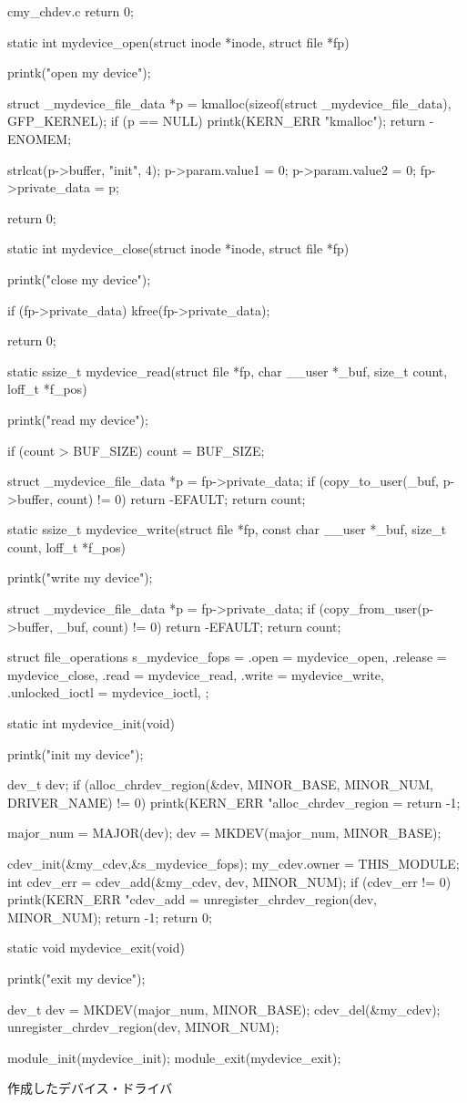 \begin{longlisting}
\begin{myminted}{c}{my\_chdev.c}
{    return 0;
}

static int mydevice_open(struct inode *inode, struct file *fp) {
    printk("open my device\n");

    struct _mydevice_file_data *p = kmalloc(sizeof(struct _mydevice_file_data), GFP_KERNEL);
    if (p == NULL) {
        printk(KERN_ERR  "kmalloc\n");
        return -ENOMEM;
    }

    strlcat(p->buffer, "init", 4);
    p->param.value1 = 0;
    p->param.value2 = 0;
    fp->private_data = p;

    return 0;
}

static int mydevice_close(struct inode *inode, struct file *fp) {
    printk("close my device\n");

    if (fp->private_data) {
        kfree(fp->private_data);
    }

    return 0;
}

static ssize_t mydevice_read(struct file *fp, char __user *_buf, size_t count, loff_t *f_pos) {
    printk("read my device\n");

    if (count > BUF_SIZE) count = BUF_SIZE;

    struct _mydevice_file_data *p = fp->private_data;
    if (copy_to_user(_buf, p->buffer, count) != 0) {
        return -EFAULT;
    }
    return count;
}

static ssize_t mydevice_write(struct file *fp, const char __user *_buf, size_t count, loff_t *f_pos) {
    printk("write my device\n");

    struct _mydevice_file_data *p = fp->private_data;
    if (copy_from_user(p->buffer, _buf, count) != 0) {
        return -EFAULT;
    }
    return count;
}

struct file_operations s_mydevice_fops = {
    .open    = mydevice_open,
    .release = mydevice_close,
    .read    = mydevice_read,
    .write   = mydevice_write,
    .unlocked_ioctl = mydevice_ioctl,
};

static int mydevice_init(void) {
    printk("init my device\n");

    dev_t dev;
    if (alloc_chrdev_region(&dev, MINOR_BASE, MINOR_NUM, DRIVER_NAME) != 0) {
        printk(KERN_ERR  "alloc_chrdev_region = %
        return -1;
    }

    major_num = MAJOR(dev);
    dev = MKDEV(major_num, MINOR_BASE);

    cdev_init(&my_cdev,&s_mydevice_fops);
    my_cdev.owner = THIS_MODULE;
    int cdev_err = cdev_add(&my_cdev, dev, MINOR_NUM);
    if (cdev_err != 0) {
        printk(KERN_ERR  "cdev_add = %
        unregister_chrdev_region(dev, MINOR_NUM);
        return -1;
    }
    return 0;
}

static void mydevice_exit(void) {
    printk("exit my device\n");

    dev_t dev = MKDEV(major_num, MINOR_BASE);
    cdev_del(&my_cdev);
    unregister_chrdev_region(dev, MINOR_NUM);
}

module_init(mydevice_init);
module_exit(mydevice_exit);
\end{myminted}
\caption{作成したデバイス・ドライバ}
\label{lst:chdev}
\end{longlisting}


